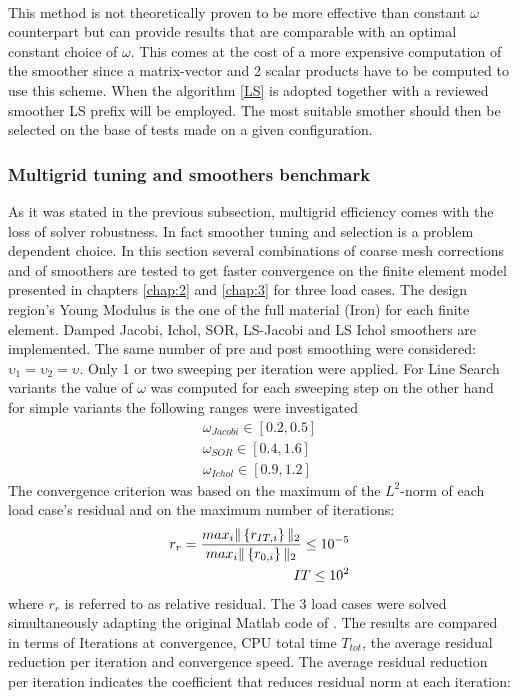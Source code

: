  \\
 This method is not theoretically proven to be more effective than constant $\omega$ counterpart but can provide results that are comparable with an optimal constant choice of $\omega$. This comes at the cost of a more expensive computation of the smoother since a matrix-vector and 2 scalar products have to be computed to use this scheme. When the algorithm \ref{LS} is adopted together with a reviewed smoother LS prefix will be employed. The most suitable smother should then be selected on the base of tests made on a given configuration.  
 \subsubsection{Multigrid tuning and smoothers benchmark}
 As it was stated in the previous subsection, multigrid efficiency comes with the loss of solver robustness. In fact smoother tuning and selection is a problem dependent choice.
 In this section several combinations of coarse mesh corrections and of smoothers are tested to get faster convergence on the finite element model presented in chapters \ref{chap:2} and \ref{chap:3} for three load cases. The design region's Young Modulus is the one of the full material (Iron) for each finite element.
 Damped Jacobi, Ichol, SOR, LS-Jacobi and LS Ichol smoothers are implemented. The same number of pre and post smoothing were considered: $\upsilon_1=\upsilon_2=\upsilon$. Only 1 or two sweeping per iteration were applied. For Line Search variants the value of $\omega$ was computed for each sweeping step on the other hand for simple variants the following ranges were investigated
 \begin{eqnarray}
\omega_{Jacobi}\in[0.2,0.5]\\
\omega_{SOR} \in [0.4,1.6]\\
\omega_{Ichol} \in [0.9,1.2]
 \end{eqnarray}
 The convergence criterion was based on the maximum of the $L^2$-norm of each load case's residual and on the maximum number of iterations:
 \begin{eqnarray}
 r_r=\frac{max_i\|\left\lbrace{r_{IT,i}}\right \rbrace\|_2}{max_i\|\left\lbrace{r_{0,i}}\right \rbrace\|_2}\leq 10^{-5}\\
  IT\leq 10^{2}
 \end{eqnarray}
 where $ r_r$ is referred to as relative residual.
  The 3 load cases were solved simultaneously adapting the original Matlab code of \cite{amir2014multigrid}.
 The results are compared in terms of Iterations at convergence, CPU total time $T_{tot}$, the average residual reduction per iteration and convergence speed. The average residual reduction per iteration indicates the coefficient that reduces residual norm at each iteration:
